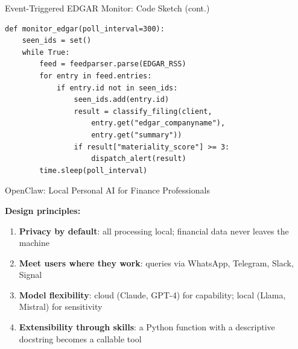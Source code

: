\documentclass[9pt,t]{beamer}
\begin{document}
\begin{frame}{Event-Triggered EDGAR Monitor: Code Sketch (cont.)}

\begin{lstlisting}
def monitor_edgar(poll_interval=300):
    seen_ids = set()
    while True:
        feed = feedparser.parse(EDGAR_RSS)
        for entry in feed.entries:
            if entry.id not in seen_ids:
                seen_ids.add(entry.id)
                result = classify_filing(client,
                    entry.get("edgar_companyname"),
                    entry.get("summary"))
                if result["materiality_score"] >= 3:
                    dispatch_alert(result)
        time.sleep(poll_interval)
\end{lstlisting}
\end{frame}

\begin{frame}[noframenumbering]{OpenClaw: Local Personal AI for Finance Professionals}

\textbf{Design principles:}
\begin{enumerate}
  \item \textbf{Privacy by default}: all processing local; financial data never leaves the machine
  \item \textbf{Meet users where they work}: queries via WhatsApp, Telegram, Slack, Signal
  \item \textbf{Model flexibility}: cloud (Claude, GPT-4) for capability; local (Llama, Mistral) for sensitivity
  \item \textbf{Extensibility through skills}: a Python function with a descriptive docstring becomes a callable tool
\end{enumerate}
\end{frame}
\end{document}
